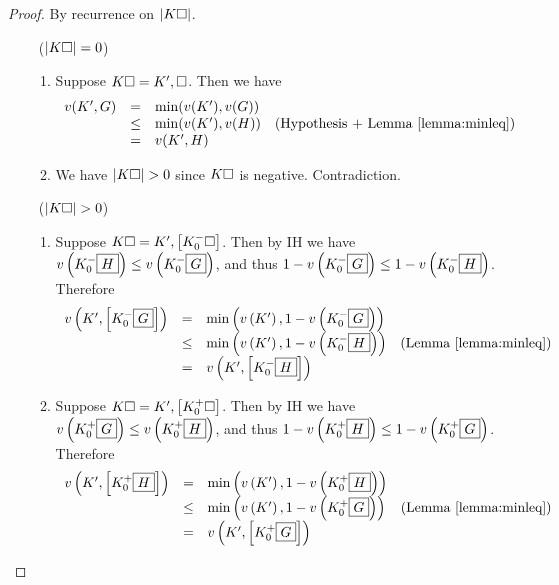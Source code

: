 \begin{proof}
  By recurrence on $\left|K\square\right|$.

  \def\arraystretch{1.5}
  \begin{itemize}
    \item[\bcase~($\left|K\square\right| = 0$)]\sbr
      \begin{enumerate}
        \item Suppose $K\square = K', \square$. Then we have
        $$
        \begin{array}{rcll}
          v(K', G)
          &=& \min(v(K'), v(G)) & \\
          &\leq& \min(v(K'), v(H)) &\text{(Hypothesis + \reflemma{minleq})} \\
          &=& v(K', H) &
        \end{array}
        $$

        \item We have $\left|K\square\right| > 0$ since $K\square$ is negative.
        Contradiction.
      \end{enumerate}
    \item[\rcase~($\left|K\square\right| > 0$)]\sbr
      \begin{enumerate}
        \item Suppose $K\square = K', \left[K_0^-\square\right]$. Then by IH we have
        $v\left(K_0^-\fbox{$H$}\right) \leq v\left(K_0^-\fbox{$G$}\right)$, and thus
        $1 - v\left(K_0^-\fbox{$G$}\right) \leq 1 - v\left(K_0^-\fbox{$H$}\right)$. Therefore
        $$
        \begin{array}{rcll}
          v\left(K', \left[K_0^-\select{G}\right]\right)
          &=& \min\left(v\left(K'\right), 1 - v\left(K_0^-\select{G}\right)\right) & \\
          &\leq& \min\left(v\left(K'\right), 1 - v\left(K_0^-\select{H}\right)\right) &\text{(\reflemma{minleq})} \\
          &=& v\left(K', \left[K_0^-\select{H}\right]\right) &
        \end{array}
        $$

        \item Suppose $K\square = K', \left[K_0^+\square\right]$. Then by IH we have
        $v\left(K_0^+\fbox{$G$}\right) \leq v\left(K_0^+\fbox{$H$}\right)$, and thus
        $1 - v\left(K_0^+\fbox{$H$}\right) \leq 1 - v\left(K_0^+\fbox{$G$}\right)$. Therefore
        $$
        \begin{array}{rcll}
          v\left(K', \left[K_0^+\select{H}\right]\right)
          &=& \min\left(v\left(K'\right), 1 - v\left(K_0^+\select{H}\right)\right) & \\
          &\leq& \min\left(v\left(K'\right), 1 - v\left(K_0^+\select{G}\right)\right) &\text{(\reflemma{minleq})} \\
          &=& v\left(K', \left[K_0^+\select{G}\right]\right) &
        \end{array}
        $$
      \end{enumerate}
  \end{itemize}
\end{proof}

